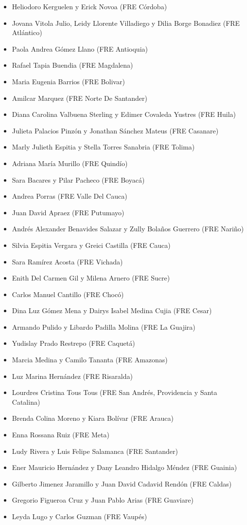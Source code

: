 \documentclass[
]{book}
\begin{document}
\begin{itemize}
\item
  Heliodoro Kerguelen y Erick Novoa (FRE Córdoba)
\item
  Jovana Vitola Julio, Leidy Llorente Villadiego y Dilia Borge Bonadiez (FRE Atlántico)
\item
  Paola Andrea Gómez Llano (FRE Antioquia)
\item
  Rafael Tapia Buendia (FRE Magdalena)
\item
  Maria Eugenia Barrios (FRE Bolivar)
\item
  Amilcar Marquez (FRE Norte De Santander)
\item
  Diana Carolina Valbuena Sterling y Edimer Covaleda Yustres (FRE Huila)
\item
  Julieta Palacios Pinzón y Jonathan Sánchez Mateus (FRE Casanare)
\item
  Marly Julieth Espitia y Stella Torres Sanabria (FRE Tolima)
\item
  Adriana María Murillo (FRE Quindío)
\item
  Sara Bacares y Pilar Pacheco (FRE Boyacá)
\item
  Andrea Porras (FRE Valle Del Cauca)
\item
  Juan David Apraez (FRE Putumayo)
\item
  Andrés Alexander Benavides Salazar y Zully Bolaños Guerrero (FRE Nariño)
\item
  Silvia Espitia Vergara y Greici Castilla (FRE Cauca)
\item
  Sara Ramírez Acosta (FRE Vichada)
\item
  Enith Del Carmen Gil y Milena Arnero (FRE Sucre)
\item
  Carlos Manuel Cantillo (FRE Chocó)
\item
  Dina Luz Gómez Mena y Dairys Isabel Medina Cujia (FRE Cesar)
\item
  Armando Pulido y Libardo Padilla Molina (FRE La Guajira)
\item
  Yudislay Prado Restrepo (FRE Caquetá)
\item
  Marcia Medina y Camilo Tananta (FRE Amazonas)
\item
  Luz Marina Hernández (FRE Risaralda)
\item
  Lourdres Cristina Tous Tous (FRE San Andrés, Providencia y Santa Catalina)
\item
  Brenda Colina Moreno y Kiara Bolívar (FRE Arauca)
\item
  Enna Rossana Ruiz (FRE Meta)
\item
  Ludy Rivera y Luis Felipe Salamanca (FRE Santander)
\item
  Ener Mauricio Hernández y Dany Leandro Hidalgo Méndez (FRE Guainia)
\item
  Gilberto Jimenez Jaramillo y Juan David Cadavid Rendón (FRE Caldas)
\item
  Gregorio Figueroa Cruz y Juan Pablo Arias (FRE Guaviare)
\item
  Leyda Lugo y Carlos Guzman (FRE Vaupés)
\end{itemize}
\end{document}
